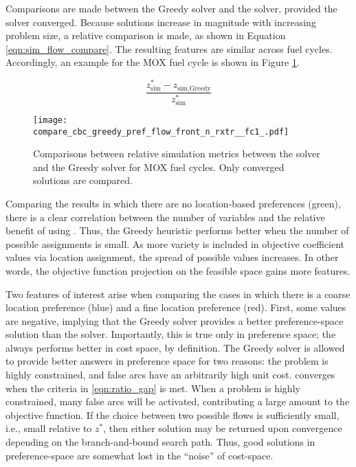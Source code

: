 Comparisons are made between the Greedy solver and the \cbc solver, provided the
\cbc solver converged. Because solutions increase in magnitude with increasing
problem size, a relative comparison is made, as shown in Equation
\ref{eqn:sim_flow_compare}. The resulting features are similar across fuel
cycles. Accordingly, an example for the MOX fuel cycle is shown in Figure
\ref{fig:compare_cbc_greedy_pref_flow_front_n_rxtr__fc1_}.

\begin{equation}\label{eqn:sim_flow_compare}
\frac{z^*_{\text{sim}} - z_{\text{sim}, \text{Greedy}}}
     {z^*_{\text{sim}}} 
\end{equation}

\begin{figure}[h!]
  \begin{center}
    \texttt{[image: compare\_cbc\_greedy\_pref\_flow\_front\_n\_rxtr\_\_fc1\_.pdf]}
    \caption{
      \label{fig:compare_cbc_greedy_pref_flow_front_n_rxtr__fc1_}
      Comparisons between relative simulation metrics between the \cbc solver and
      the Greedy solver for MOX fuel cycles. Only converged \cbc
      solutions are compared.  }
  \end{center}
\end{figure}

Comparing the results in which there are no location-based preferences (green),
there is a clear correlation between the number of variables and the relative
benefit of using \cbc. Thus, the Greedy heuristic performs better when the number
of possible assignments is small. As more variety is included in objective
coefficient values via location assignment, the spread of possible values
increases. In other words, the objective function projection on the feasible
space gains more features.

Two features of interest arise when comparing the cases in which there is a
coarse location preference (blue) and a fine location preference (red). First,
some values are negative, implying that the Greedy solver provides a better
preference-space solution than the \cbc solver. Importantly, this is true only in
preference space; the \cbc always performs better in cost space, by
definition. The Greedy solver is allowed to provide better answers in preference
space for two reasons: the problem is highly constrained, and false arcs have an
arbitrarily high unit cost. \cbc converges when the criteria in
\ref{eqn:ratio_gap} is met. When a problem is highly constrained, many false
arcs will be activated, contributing a large amount to the objective
function. If the choice between two possible flows is sufficiently small, i.e.,
small relative to $z^*$, then either solution may be returned upon convergence
depending on the branch-and-bound search path. Thus, good solutions in
preference-space are somewhat lost in the ``noise'' of cost-space.

